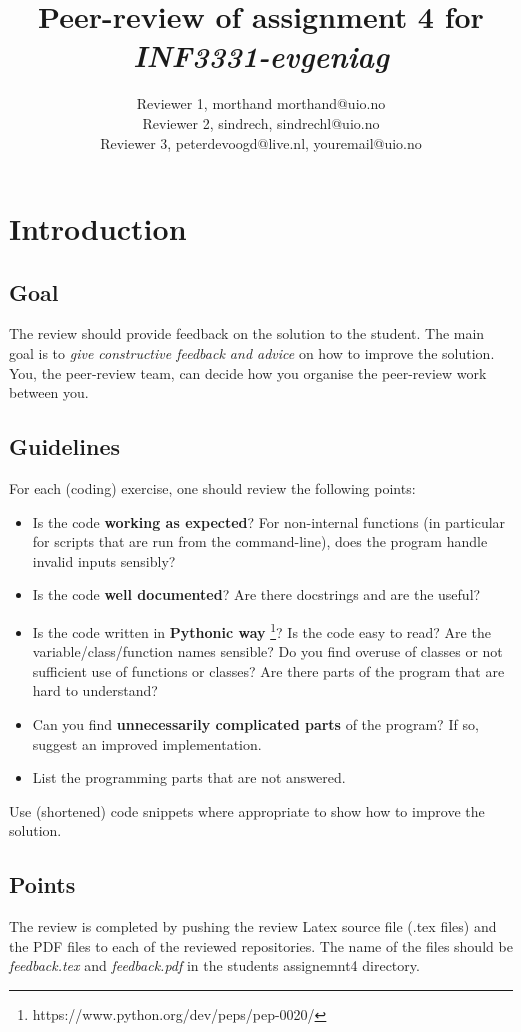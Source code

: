 \documentclass[a4paper]{article}
\title{Peer-review of assignment 4 for \textit{INF3331-evgeniag}}
\author{Reviewer 1, morthand {morthand@uio.no} \\
 		Reviewer 2, sindrech, {sindrechl@uio.no} \\
		Reviewer 3, peterdevoogd@live.nl, {youremail@uio.no}}
\begin{document}
\maketitle

\section{Introduction}
\subsection{Goal}
The review should provide feedback on the solution to the student. The main goal is to \emph{give constructive feedback and advice} on how to improve the solution. You, the peer-review team, can decide how you organise the peer-review work between you. 

\subsection{Guidelines}\label{sec:general_review}
For each (coding) exercise, one should review the following points:

\begin{itemize}
  \item Is the code \textbf{working as expected}? For non-internal functions (in particular for scripts that are run from the command-line), does the program handle invalid inputs sensibly?
  \item Is the code \textbf{well documented}? Are there docstrings and are the useful?
  \item Is the code written in \textbf{Pythonic way} \footnote{https://www.python.org/dev/peps/pep-0020/}? Is the code easy to read? Are the variable/class/function names sensible? Do you find overuse of classes or not sufficient use of functions or classes? Are there parts of the program that are hard to understand? 
  \item Can you find \textbf{unnecessarily complicated parts} of the program? If so, suggest an improved implementation.
  \item List the programming parts that are not answered.
\end{itemize}
Use (shortened) code snippets where appropriate to show how to improve the solution. 

\subsection{Points}
The review is completed by pushing the review Latex source file (.tex files) and the PDF files to each of the reviewed repositories. The name of the files should be \emph{feedback.tex} and \emph{feedback.pdf} in the students assignemnt4 directory.
\end{document}
